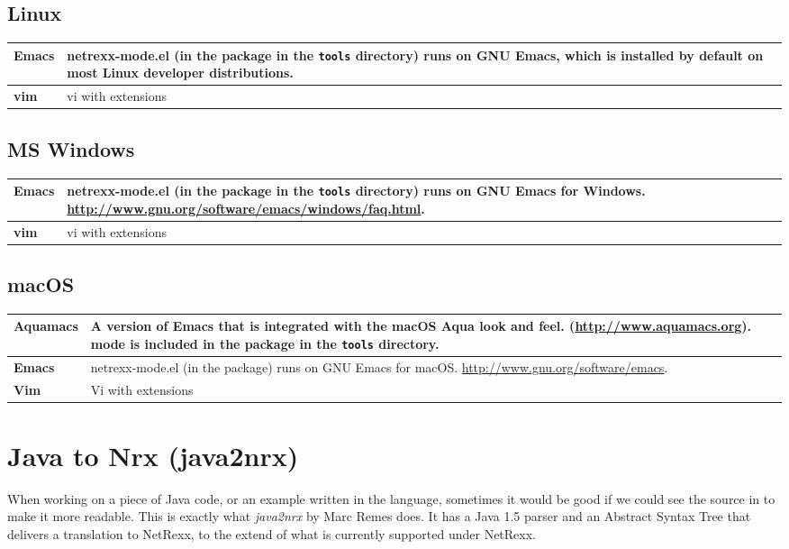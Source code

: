 {\subsection{Linux}
\begin{tabularx}{\textwidth}{>{\bfseries}lX}
\toprule
Emacs & netrexx-mode.el (in the \nr{} package in the \texttt{tools}
directory) runs on GNU Emacs, which is installed by default on most
Linux developer distributions.
\\\midrule
vim & vi with extensions
\\\bottomrule
\end{tabularx}
\subsection{MS Windows}
\begin{tabularx}{\textwidth}{>{\bfseries}lX}
\toprule
Emacs & netrexx-mode.el (in the \nr{} package in the \texttt{tools} directory) runs on GNU Emacs for
Windows. \url{http://www.gnu.org/software/emacs/windows/faq.html}.
\\\midrule
vim & vi with extensions
\\\bottomrule
\end{tabularx}
\subsection{macOS}
\begin{tabularx}{\textwidth}{>{\bfseries}lX}
\toprule
Aquamacs & A version of Emacs that is integrated with the macOS Aqua
look and feel. (\url{http://www.aquamacs.org}). \nr{} mode is
included in the \nr{} package in the \texttt{tools} directory.
\\\midrule
Emacs & netrexx-mode.el (in the \nr{} package) runs on GNU Emacs for
macOS. \url{http://www.gnu.org/software/emacs}.
\\\midrule
Vim & Vi with extensions
\\\bottomrule
\end{tabularx}
\section{Java to Nrx (java2nrx)}
When working on a piece of Java code, or an example written in the
language, sometimes it would be good if we could see the source in
\nr{} to make it more readable. This is exactly what \emph{java2nrx}
by Marc Remes does. It has a  Java 1.5 parser and an Abstract Syntax
Tree that delivers a translation to NetRexx, to the
extend of what is currently supported under NetRexx.

}
